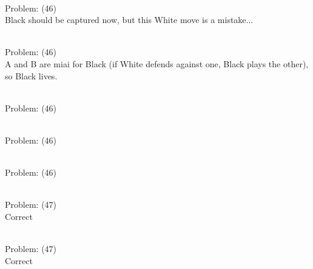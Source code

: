 \documentclass[11pt]{article}
\begin{document}
\begin{minipage}[t]{0.5\textwidth}
  {\centering
  
\\
Problem: (46)\\
Black should be captured now, but this White move is a mistake...\\
  }
\end{minipage}
\begin{minipage}[t]{0.5\textwidth}
  {\centering
  
\\
Problem: (46)\\
A and B are miai for Black (if White defends against one, Black plays the other), so Black lives.\\
  }
\end{minipage}
\begin{minipage}[t]{0.5\textwidth}
  {\centering
  
\\
Problem: (46)\\
  }
\end{minipage}
\begin{minipage}[t]{0.5\textwidth}
  {\centering
  
\\
Problem: (46)\\
  }
\end{minipage}
\begin{minipage}[t]{0.5\textwidth}
  {\centering
  
\\
Problem: (46)\\
  }
\end{minipage}
\begin{minipage}[t]{0.5\textwidth}
  {\centering
  
\\
Problem: (47)\\
Correct\\
  }
\end{minipage}
\begin{minipage}[t]{0.5\textwidth}
  {\centering
  
\\
Problem: (47)\\
Correct\\
  }
\end{minipage}
\end{document}
